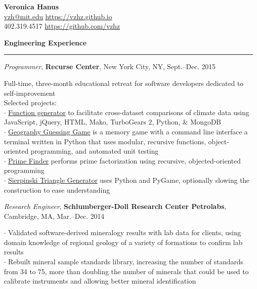 \documentclass[11pt]{article}
\begin{document}
\bigskip
\begin{flushleft}
\LARGE{\textbf{Veronica Hanus}} \\
\large{\href{mailto:vzh@mit.edu}{vzh@mit.edu}} \hspace{0.05in} \normalsize{\url{https://vzhz.github.io}} \\
\normalsize{402.319.4517} \hspace{0.13in} \normalsize{\url{https://github.com/vzhz}} \\
\end{flushleft}
\smallskip

\vspace*{0.25 mm}
\textbf{Engineering Experience}
\smallskip
\hrule
\emph{Programmer}, \textbf {Recurse Center}, New York City, NY, Sept.--Dec. 2015 \\ 
\begin{small}Full-time, three-month educational retreat for software developers dedicated to self-improvement\\
Selected projects:\\ 
$\cdot$ {\href{https://github.com/vzhz/function_generator/blob/master/README.md}{Function generator} to facilitate cross-dataset comparisons of climate data using JavaScript, jQuery, HTML, Mako, TurboGears 2, Python, \& MongoDB}\\
$\cdot$ {\href{https://github.com/vzhz/geography_guessing_game/blob/master/README.md}{Geography Guessing Game} is a memory game with a command line interface a terminal written in Python that uses modular, recursive functions, object-oriented programming, and automated unit testing}\\
$\cdot$ {\href{https://github.com/vzhz/primes/blob/master/README.md}{Prime Finder} performs prime factorization using recursive, objected-oriented programming}\\
$\cdot$ {\href{https://github.com/vzhz/triangle_problem_1/blob/master/README.md}{Sierpinski Triangle Generator} uses Python and PyGame, optionally slowing the construction to ease understanding}\end{small}

\smallskip
\emph{Research Engineer}, \textbf {Schlumberger-Doll Research Center Petrolabs}, Cambridge, MA, Mar.--Dec. 2014 \\ 
\begin{small}$\cdot$ {Validated software-derived mineralogy results with lab data for clients, using domain knowledge of regional geology of a variety of formations to confirm lab results}\\
$\cdot$ {Rebuilt mineral sample standards library, increasing the number of standards from 34 to 75, more than doubling the number of minerals that could be used to calibrate instruments and allowing better mineral identification}\end{small} 
\end{document}
